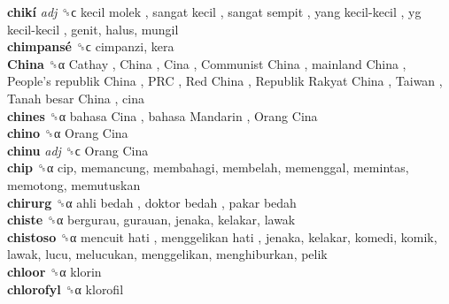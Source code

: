 \textbf{chikí} \emph{adj}  ␝ϲ   kecil molek ,  sangat kecil ,  sangat sempit ,  yang kecil-kecil ,  yg kecil-kecil , genit, halus, mungil  \\
\textbf{chimpansé} ␝ϲ  cimpanzi, kera  \\
\textbf{China} ␝α   Cathay ,  China ,  Cina ,  Communist China ,  mainland China ,  People’s republik China ,  PRC ,  Red China ,  Republik Rakyat China ,  Taiwan ,  Tanah besar China , cina  \\
\textbf{chines} ␝α   bahasa Cina ,  bahasa Mandarin ,  Orang Cina   \\
\textbf{chino} ␝α   Orang Cina   \\
\textbf{chinu} \emph{adj}  ␝ϲ   Orang Cina   \\
\textbf{chip} ␝α  cip, memancung, membahagi, membelah, memenggal, memintas, memotong, memutuskan  \\
\textbf{chirurg} ␝α   ahli bedah ,  doktor bedah ,  pakar bedah   \\
\textbf{chiste} ␝α  bergurau, gurauan, jenaka, kelakar, lawak  \\
\textbf{chistoso} ␝α   mencuit hati ,  menggelikan hati , jenaka, kelakar, komedi, komik, lawak, lucu, melucukan, menggelikan, menghiburkan, pelik  \\
\textbf{chloor} ␝α  klorin  \\
\textbf{chlorofyl} ␝α  klorofil  \\
